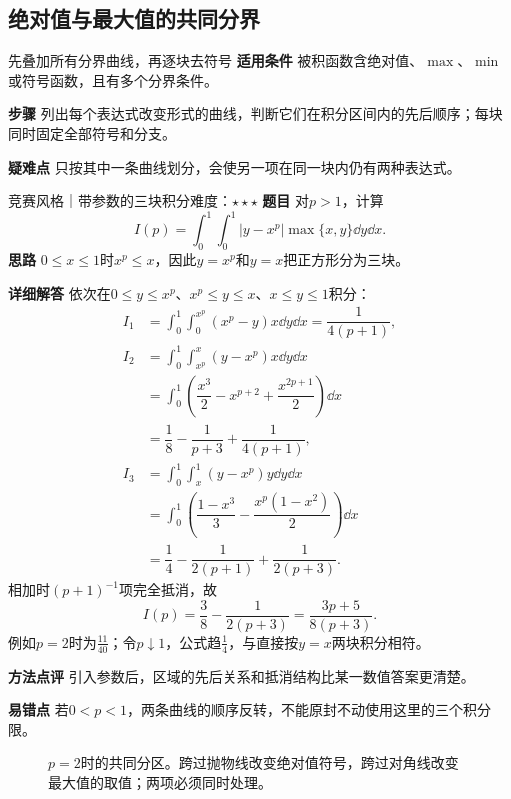 \subsection{绝对值与最大值的共同分界}\label{cmi:partition}
\begin{method}{先叠加所有分界曲线，再逐块去符号}
\textbf{适用条件} 被积函数含绝对值、$\max$、$\min$或符号函数，且有多个分界条件。\par
\textbf{步骤} 列出每个表达式改变形式的曲线，判断它们在积分区间内的先后顺序；每块同时固定全部符号和分支。\par
\textbf{疑难点} 只按其中一条曲线划分，会使另一项在同一块内仍有两种表达式。
\end{method}
\begin{example}{竞赛风格｜带参数的三块积分}{难度：$\star\star\star$}
\label{cmi:ex:partition}
\textbf{题目} 对$p>1$，计算
\[
I(p)=\int_0^1\int_0^1|y-x^p|\max\{x,y\}\dd y\dd x.
\]
\textbf{思路} $0\le x\le1$时$x^p\le x$，因此$y=x^p$和$y=x$把正方形分为三块。\par
\textbf{详细解答} 依次在$0\le y\le x^p$、$x^p\le y\le x$、$x\le y\le1$积分：
\[
\begin{aligned}
I_1&=\int_0^1\int_0^{x^p}(x^p-y)x\dd y\dd x
    =\dfrac1{4(p+1)},\\
I_2&=\int_0^1\int_{x^p}^{x}(y-x^p)x\dd y\dd x\\
   &=\int_0^1\left(\dfrac{x^3}2-x^{p+2}+\dfrac{x^{2p+1}}2\right)\dd x\\
   &=\dfrac18-\dfrac1{p+3}+\dfrac1{4(p+1)},\\
I_3&=\int_0^1\int_x^1(y-x^p)y\dd y\dd x\\
   &=\int_0^1\left(\dfrac{1-x^3}3-\dfrac{x^p(1-x^2)}2\right)\dd x\\
   &=\dfrac14-\dfrac1{2(p+1)}+\dfrac1{2(p+3)}.
\end{aligned}
\]
相加时$(p+1)^{-1}$项完全抵消，故
\[
I(p)=\dfrac38-\dfrac1{2(p+3)}
=\dfrac{3p+5}{8(p+3)}.
\]
例如$p=2$时为$\frac{11}{40}$；令$p\downarrow1$，公式趋$\frac{1}{4}$，与直接按$y=x$两块积分相符。\par
\textbf{方法点评} 引入参数后，区域的先后关系和抵消结构比某一数值答案更清楚。\par
\textbf{易错点} 若$0<p<1$，两条曲线的顺序反转，不能原封不动使用这里的三个积分限。
\end{example}
\begin{figure}[htbp]\centering
{}
\caption{$p=2$时的共同分区。跨过抛物线改变绝对值符号，跨过对角线改变最大值的取值；两项必须同时处理。}
\label{cmi:fig:partition}
\end{figure}

